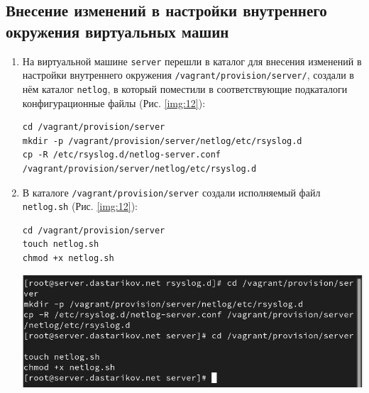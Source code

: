 \subsection{Внесение изменений в настройки внутреннего окружения виртуальных машин}
\begin{enumerate}
\item На виртуальной машине {\tt server} перешли в каталог для внесения изменений в настройки внутреннего окружения {\tt /vagrant/provision/server/}, создали в нём каталог {\tt netlog}, в который поместили в соответствующие подкаталоги конфигурационные файлы (Рис. \ref{img:12}):
    \begin{verbatim}
cd /vagrant/provision/server
mkdir -p /vagrant/provision/server/netlog/etc/rsyslog.d
cp -R /etc/rsyslog.d/netlog-server.conf /vagrant/provision/server/netlog/etc/rsyslog.d
    \end{verbatim}
\item В каталоге {\tt /vagrant/provision/server} создали исполняемый файл {\tt netlog.sh} (Рис. \ref{img:12}):
    \begin{verbatim}
cd /vagrant/provision/server
touch netlog.sh
chmod +x netlog.sh
    \end{verbatim}

\begin{center}
    \centering
    \includegraphics[width=\textwidth]{../images/image12.png}
    \label{img:12}
\end{center}


\end{enumerate}
